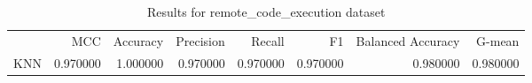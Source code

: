 \begin{table}
\caption{Results for remote_code_execution dataset}
\begin{tabular}{lrrrrrrr}
 & MCC & Accuracy & Precision & Recall & F1 & Balanced Accuracy & G-mean \\
KNN & 0.970000 & 1.000000 & 0.970000 & 0.970000 & 0.970000 & 0.980000 & 0.980000 \\
\end{tabular}
\end{table}

